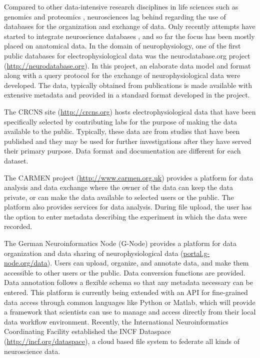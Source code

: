 \documentclass{frontiersSCNS} %
\begin{document}
Compared to other data-intensive research disciplines in life sciences such as
genomics and proteomics \citep{Gelbart1997, Stoesser1997, DeSchutter2008},
neurosciences lag behind regarding the use of databases for the organization
and exchange of data. Only recently attempts have started to integrate
neuroscience databases \citep{Amari2002, Gupta2008}, and so far the focus has
been mostly placed on anatomical data. In the domain of neurophysiology, one of
the first public databases for electrophysiological data was the
neurodatabase.org project (\url{http://neurodatabase.org}). In this project, an
elaborate data model and format along with a query protocol for the exchange of
neurophysiological data were developed. The data, typically obtained from
publications is made available with extensive metadata and provided in a
standard format developed in the project.

The CRCNS site (\url{http://crcns.org}) hosts electrophysiological data that
have been specifically selected by contributing labs for the purpose of making
the data available to the public. Typically, these data are from studies that
have been published and they may be used for further investigations after they
have served their primary purpose. Data format and documentation are different
for each dataset.

The CARMEN project (\url{http://www.carmen.org.uk}) provides a platform for data analysis
and data exchange where the owner of the data can keep the data private, or can
make the data available to selected users or the public. The platform also
provides services for data analysis. During file upload, the user has the
option to enter metadata describing the experiment in which the data were
recorded. 

The German Neuroinformatics Node (G-Node) provides a platform for data
organization and data sharing of neurophysiological data
(\url{portal.g-node.org/data}). Users can upload, organize, and annotate data, and
make them accessible to other users or the public. Data conversion functions
are provided. Data annotation follows a flexible schema \citep{Grewe2011} so
that any metadata necessary can be entered. This platform is currently being
extended with an API for fine-grained data access through common languages like
Python or Matlab, which will provide a framework that scientists can use to
manage and access directly from their local data workflow environment.
Recently, the International Neuroinformatics Coordinating Facility established
the INCF Dataspace (\url{http://incf.org/dataspace}), a cloud based file system to federate
all kinds of neuroscience data.
\end{document}
